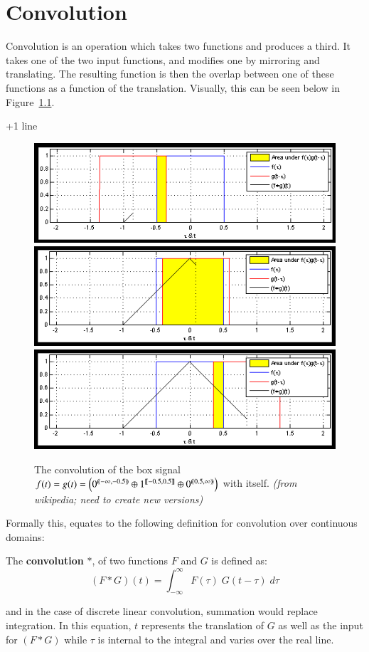 \chapter{Convolution}

Convolution is an operation which takes two functions and produces a third.
It takes one of the two input functions, and modifies one by mirroring and translating.
The resulting function is then the overlap between one of these functions as a function of the translation.
Visually, this can be seen below in Figure~\ref{fig:ConvolutionExample}.

+1 line

\begin{figure}[ht]
	\caption[Convolution of box signal with itself]{The convolution of the box signal 
	$f(t)=g(t)=\left( 0^{ (\!( -\infty,-0.5 )\!) } \oplus 1^{ [\![ -0.5,0.5 ]\!] } \oplus 0^{ (\!( 0.5,\infty )\!) } \right)$ with itself.
	\emph{(from wikipedia; need to create new versions)}
	\label{fig:ConvolutionExample}}
	\centering
	\includegraphics[scale=0.5]{diagrams/conv1}
	\includegraphics[scale=0.5]{diagrams/conv2}
	\includegraphics[scale=0.5]{diagrams/conv3}
\end{figure}

Formally this, equates to the following definition for convolution over continuous domains:
\begin{definition}
	The \textbf{convolution} $*$, of two functions $F$ and $G$ is defined as:
	\begin{equation}
		(F*G)(t) = \int_{-\infty}^\infty F(\tau) \;G(t - \tau) \; d\tau
	\end{equation}
\end{definition}
and in the case of discrete linear convolution, summation would replace integration.
In this equation, $t$ represents the translation of $G$ as well as the input for $(F*G)$
while $\tau$ is internal to the integral and varies over the real line.


